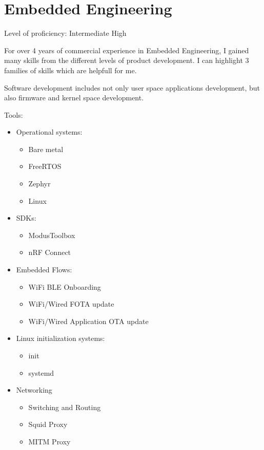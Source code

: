 \section{Embedded Engineering}

Level of proficiency: Intermediate High

\vintent

For over 4 years of commercial experience in Embedded Engineering,
I gained many skills from the different levels of product development. I can
highlight 3 families of skills which are helpfull for me.

Software development includes not only user space applications development,
but also firmware and kernel space development.

\vintent

Tools:
\begin{itemize}
    \item Operational systems:
    \begin{itemize}
        \item Bare metal
        \item FreeRTOS
        \item Zephyr
        \item Linux
    \end{itemize}

    \item SDKs:
    \begin{itemize}
        \item ModusToolbox
        \item nRF Connect
    \end{itemize}

    \item Embedded Flows:
    \begin{itemize}
        \item WiFi BLE Onboarding
        \item WiFi/Wired FOTA update
        \item WiFi/Wired Application OTA update
    \end{itemize}

    \item Linux initialization systems:
    \begin{itemize}
        \item init
        \item systemd
    \end{itemize}

    \item Networking
    \begin{itemize}
        \item Switching and Routing
        \item Squid Proxy
        \item MITM Proxy
    \end{itemize}


\end{itemize}
